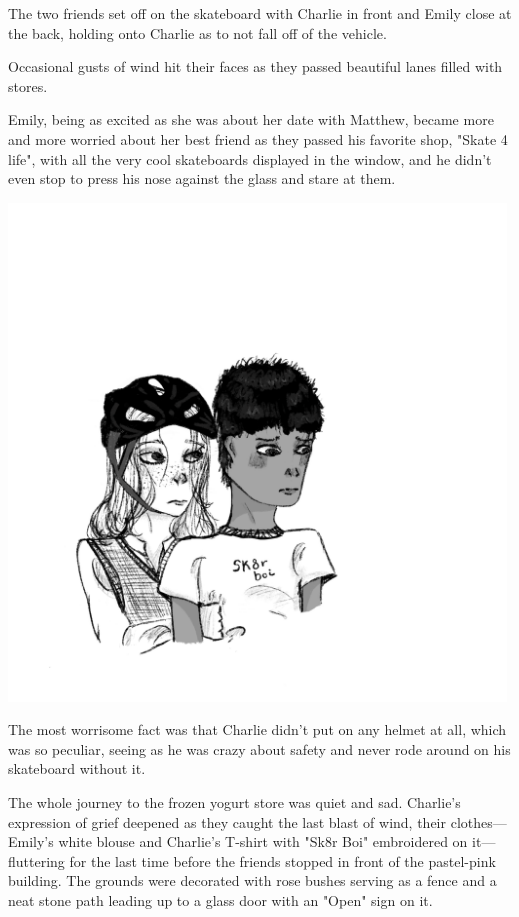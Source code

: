 The two friends set off on the skateboard with Charlie in front and Emily close at the back, holding onto Charlie as to not fall off of the vehicle.

Occasional gusts of wind hit their faces as they passed beautiful lanes filled with stores.

Emily, being as excited as she was about her date with Matthew, became more and more worried about her best friend as they passed his favorite shop, "Skate 4 life", with all the very cool skateboards displayed in the window, and he didn't even stop to press his nose against the glass and stare at them.

\includegraphics[width=0.99\textwidth]{Emily&Charlie.png}

The most worrisome fact was that Charlie didn't put on any helmet at all, which was so peculiar, seeing as he was crazy about safety and never rode around on his skateboard without it.

The whole journey to the frozen yogurt store was quiet and sad. Charlie's expression of grief deepened as they caught the last blast of wind, their clothes—Emily's white blouse and Charlie's T-shirt with "Sk8r Boi" embroidered on it—fluttering for the last time before the friends stopped in front of the pastel-pink building. The grounds were decorated with rose bushes serving as a fence and a neat stone path leading up to a glass door with an "Open" sign on it.

